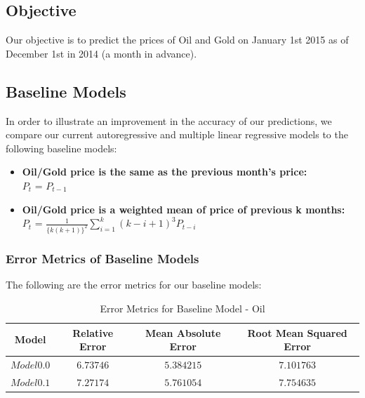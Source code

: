 \documentclass[runningheads]{llncs}
\begin{document}
\subsection{Objective}
Our objective is to predict the prices of Oil and Gold on January 1st 2015 as of December 1st in 2014 (a month in advance).

\subsection{Baseline Models}
In order to illustrate an improvement in the accuracy of our predictions, we compare our current autoregressive and multiple linear regressive models to the following baseline models:

\begin {itemize}
\item \textbf{Oil/Gold price is the same as the previous month's price:} \\
$P_{t}$ = $P_{t-1}$\\
\item \textbf{Oil/Gold price is a weighted mean of price of previous k months:} \\
$P_{t}$ = $\frac{1}{\{k(k+1)\}^2}\sum\limits_{i=1}^k (k-i+1)^3P_{t-i}$
\end {itemize}

\subsubsection {Error Metrics of Baseline Models} The following are the error metrics for our baseline models: \\

\begin{table}
\begin{center}
\begin{tabular}{|c|c|c|c|}
\hline
Model & Relative Error & Mean Absolute Error & Root Mean Squared Error \\ \hline
$ Model 0.0 $ & $6.73746$ & $5.384215$ & $7.101763$ \\ \hline
$ Model 0.1 $ & $7.27174$ & $5.761054$ & $7.754635$\\ \hline
\end{tabular}
\end{center}
\caption{Error Metrics for Baseline Model - Oil}
\end{table}
\end{document}
